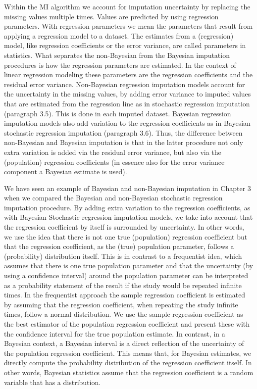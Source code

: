 \documentclass[]{book}
\theoremstyle{definition}
\theoremstyle{definition}
\theoremstyle{definition}
\theoremstyle{remark}
\begin{document}
Within the MI algorithm we account for imputation uncertainty by
replacing the missing values multiple times. Values are predicted by
using regression parameters. With regression parameters we mean the
parameters that result from applying a regression model to a dataset.
The estimates from a (regression) model, like regression coefficients or
the error variance, are called parameters in statistics. What separates
the non-Bayesian from the Bayesian imputation procedures is how the
regression parameters are estimated. In the context of linear regression
modeling these parameters are the regression coefficients and the
residual error variance. Non-Bayesian regression imputation models
account for the uncertainty in the missing values, by adding error
variance to imputed values that are estimated from the regression line
as in stochastic regression imputation (paragraph 3.5). This is done in
each imputed dataset. Bayesian regression imputation models also add
variation to the regression coefficients as in Bayesian stochastic
regression imputation (paragraph 3.6). Thus, the difference between
non-Bayesian and Bayesian imputation is that in the latter procedure not
only extra variation is added via the residual error variance, but also
via the (population) regression coefficients (in essence also for the
error variance component a Bayesian estimate is used).

We have seen an example of Bayesian and non-Bayesian imputation in
Chapter 3 when we compared the Bayesian and non-Bayesian stochastic
regression imputation procedure. By adding extra variation to the
regression coefficients, as with Bayesian Stochastic regression
imputation models, we take into account that the regression coefficient
by itself is surrounded by uncertainty. In other words, we use the idea
that there is not one true (population) regression coefficient but that
the regression coefficient, as the (true) population parameter, follows
a (probability) distribution itself. This is in contrast to a
frequentist idea, which assumes that there is one true population
parameter and that the uncertainty (by using a confidence interval)
around the population parameter can be interpreted as a probability
statement of the result if the study would be repeated infinite times.
In the frequentist approach the sample regression coefficient is
estimated by assuming that the regression coefficient, when repeating
the study infinite times, follow a normal distribution. We use the
sample regression coefficient as the best estimator of the population
regression coefficient and present these with the confidence interval
for the true population estimate. In contrast, in a Bayesian context, a
Bayesian interval is a direct reflection of the uncertainty of the
population regression coefficient. This means that, for Bayesian
estimates, we directly compute the probability distribution of the
regression coefficient itself. In other words, Bayesian statistics
assume that the regression coefficient is a random variable that has a
distribution.
\end{document}
